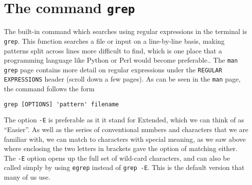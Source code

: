 \section{The command \texttt{grep}}
The built-in command which searches using regular expressions in the terminal is \texttt{grep}.
This function searches a file or input on a line-by-line basis, making patterns split across lines more difficult to find, which is one place that a programming language like Python or Perl would become preferable..  
The \texttt{man grep} page contains more detail on regular expressions under the \texttt{REGULAR EXPRESSIONS} header (scroll down a few pages).  
As can be seen in the \texttt{man} page, the command follows the form
\begin{lstlisting}[style=command_syntax]
grep [OPTIONS] 'pattern' filename
\end{lstlisting}
The option \texttt{-E} is preferable as it it stand for Extended, which we can think of as ``Easier''.
As well as the series of conventional numbers and characters that we are familiar with, we can match to characters with special meaning, as we saw above where enclosing the two letters in brackets gave the option of matching either. 
The \texttt{-E} option opens up the full set of wild-card characters, and can also be called simply by using \texttt{egrep} instead of \texttt{grep -E}.
This is the default version that many of us use.\\

